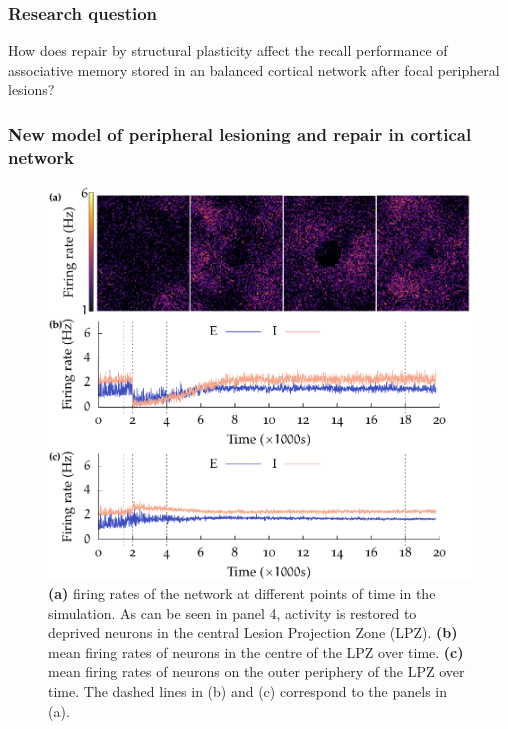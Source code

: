 \begin{frame}
  \titlepage{}
\end{frame}

\begin{frame}[c]
  \frametitle{Research question}
  How does repair by structural plasticity affect the recall performance of associative memory stored in an balanced cortical network after focal peripheral lesions?
\end{frame}
\begin{frame}[c]
  \frametitle{New model of peripheral lesioning and repair in cortical network}
  \begin{figure}[h]
    \centering
    \includegraphics[width=0.5\linewidth]{99_images/deaff-repair}
    \caption{\textbf{(a)} firing rates of the network at different points of time in the simulation. As can be seen in panel 4, activity is restored to deprived neurons in the central Lesion Projection Zone (LPZ).
      \textbf{(b)} mean firing rates of neurons in the centre of the LPZ over time.
      \textbf{(c)} mean firing rates of neurons on the outer periphery of the LPZ over time.
      The dashed lines in (b) and (c) correspond to the panels in (a).}
  \end{figure}
\end{frame}
